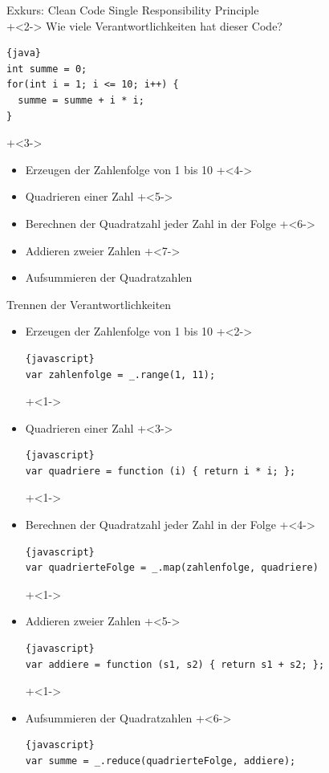 \begin{frame}[fragile]{Exkurs: Clean Code}
Single Responsibility Principle
\\[2em]

\onslide+<2->
Wie viele Verantwortlichkeiten hat dieser Code?
\begin{lstlisting}{java}
int summe = 0;
for(int i = 1; i <= 10; i++) {
  summe = summe + i * i;
}
\end{lstlisting}

\onslide+<3->
\begin{itemize}
\item Erzeugen der Zahlenfolge von 1 bis 10
\onslide+<4->
\item Quadrieren einer Zahl
\onslide+<5->
\item Berechnen der Quadratzahl jeder Zahl in der Folge
\onslide+<6->
\item Addieren zweier Zahlen
\onslide+<7->
\item Aufsummieren der Quadratzahlen
\end{itemize}

\end{frame}

\begin{frame}[fragile]{Trennen der Verantwortlichkeiten}
\begin{itemize}
\item Erzeugen der Zahlenfolge von 1 bis 10
\onslide+<2->
\begin{lstlisting}{javascript}
var zahlenfolge = _.range(1, 11);
\end{lstlisting}
\onslide+<1->
\item Quadrieren einer Zahl
\onslide+<3->
\begin{lstlisting}{javascript}
var quadriere = function (i) { return i * i; };
\end{lstlisting}
\onslide+<1->
\item Berechnen der Quadratzahl jeder Zahl in der Folge
\onslide+<4->
\begin{lstlisting}{javascript}
var quadrierteFolge = _.map(zahlenfolge, quadriere)
\end{lstlisting}
\onslide+<1->
\item Addieren zweier Zahlen
\onslide+<5->
\begin{lstlisting}{javascript}
var addiere = function (s1, s2) { return s1 + s2; };
\end{lstlisting}
\onslide+<1->
\item Aufsummieren der Quadratzahlen
\onslide+<6->
\begin{lstlisting}{javascript}
var summe = _.reduce(quadrierteFolge, addiere);
\end{lstlisting}
\end{itemize}

\end{frame}

